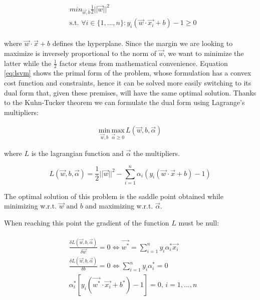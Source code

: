 \begin{gather}
    \begin{aligned}
        & min_{\vec{w},b}\frac{1}{2}||\vec{w}||^2 \\
        & \text{s.t. } \forall i \in \{1,\dots, n\} : y_i(\vec{w}\cdot\vec{x_i} + b) - 1 \geq 0 
        \label{eq:lsvm}
    \end{aligned}
\end{gather}

where $\vec{w} \cdot \vec{x} + b$ defines the hyperplane.
Since the margin we are looking to maximize is inversely proportional to the norm
of $\vec{w}$, we want to minimize the latter while the $\frac{1}{2}$ factor stems
from mathematical convenience.
Equation \ref{eq:lsvm} shows the primal form of the problem, whose formulation
has a convex cost function and constraints, hence it can be solved more easily 
switching to its dual form that, given these premises, will have the same
optimal solution.
Thanks to the Kuhn-Tucker theorem we can formulate the dual form using
Lagrange's multipliers:

\begin{gather}
    \underset{\vec{w},b}{\mathrm{min}}\,\underset{\vec{\alpha}\geq 0}{\mathrm{max}}\,L(\vec{w},b,\vec{\alpha})
    \label{eq:ldual}
\end{gather}

where $L$ is the lagrangian function and $\vec{\alpha}$ the multipliers.

\begin{equation}
    L(\vec{w},b,\vec{\alpha}) = \frac{1}{2}||\vec{w}||^2 - \sum_{i=1}^n \alpha_i(y_i(\vec{w}\cdot\vec{x} + b) - 1)
    \label{eq:lagrange}
\end{equation}

The optimal solution of this problem is the saddle point obtained while minimizing
w.r.t. $\vec{w}\text{ and }b$ and maximizing w.r.t. $\vec{\alpha}$.

When reaching this point the gradient of the function $L$ must be null:

\begin{gather}
    \begin{aligned}
        & \frac{\delta L(\vec{w},b,\vec{\alpha})}{\delta\vec{w}} = 0 \iff \vec{w^*} = \sum^{n}_{i=1} y_i\alpha^*_i\vec{x_i}\\
        & \frac{\delta L(\vec{w},b,\vec{\alpha})}{\delta b} = 0 \iff \sum_{i=1}^{n} y_i\alpha^*_i = 0\\
        & \alpha^*_i[y_i(\vec{w^*}\cdot \vec{x_i}+b^*) - 1] = 0,\,i=1,\dots,n
        \label{eq:lagrangedual}
    \end{aligned}
\end{gather}

